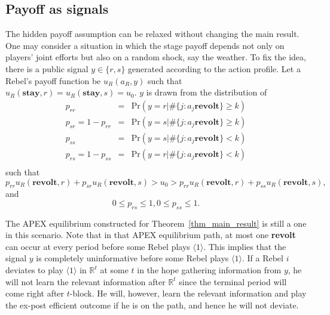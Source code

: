 \documentclass[12pt,letter]{article}
\newcommand{\Omicron}{\mathbb{R}}
\theoremstyle{definition}
\theoremstyle{definition}
\theoremstyle{remark}
\theoremstyle{claim}
\begin{document}
\subsection{Payoff as signals}
The hidden payoff assumption can be relaxed without changing the main result. One may consider a situation in which the stage payoff depends not only on players' joint efforts but also on a random shock, say the weather. To fix the idea, there is a public signal $y\in \{r,s\}$ generated according to the action profile. Let a Rebel's payoff function be $u_{R}(a_{R},y)$ such that $u_{R}(\textbf{stay},r)=u_{R}(\textbf{stay},s)=u_0$. $y$ is drawn from the distribution of 
\begin{eqnarray*}
p_{rr} &=& \mathrm {Pr}(y=r|\#\{j:a_j\textbf{revolt}\}\geq k) \\
p_{sr}=1-p_{rr} &=& \mathrm {Pr}(y=s|\#\{j:a_j\textbf{revolt}\}\geq k) \\
p_{ss} &=& \mathrm {Pr}(y=s|\#\{j:a_j\textbf{revolt}\}< k) \\
p_{rs}=1-p_{ss} &=& \mathrm {Pr}(y=r|\#\{j:a_j\textbf{revolt}\}< k) \\
\end{eqnarray*}
such that
\begin{equation*}
p_{rr}u_{R}(\textbf{revolt}, r)+p_{sr}u_{R}(\textbf{revolt}, s)>u_0>p_{rr}u_{R}(\textbf{revolt}, r)+p_{ss}u_{R}(\textbf{revolt}, s),
\end{equation*}
and
\begin{equation*}
0\leq p_{rs}\leq 1,0\leq p_{ss}\leq 1.
\end{equation*}

The APEX equilibrium constructed for Theorem~\ref{thm_main_result} is still a one in this scenario. Note that in that APEX equilibrium path, at most one \textbf{revolt} can occur at every period before some Rebel plays $\langle 1 \rangle$. This implies that the signal $y$ is completely uninformative before some Rebel plays $\langle 1 \rangle$. If a Rebel $i$ deviates to play $\langle 1 \rangle$ in $\Omicron^t$ at some $t$ in the hope gathering information from $y$, he will not learn the relevant information after $\Omicron^t$ since the terminal period will come right after $t$-block. He will, however, learn the relevant information and play the ex-post efficient outcome if he is on the path, and hence he will not deviate.

\end{document}
